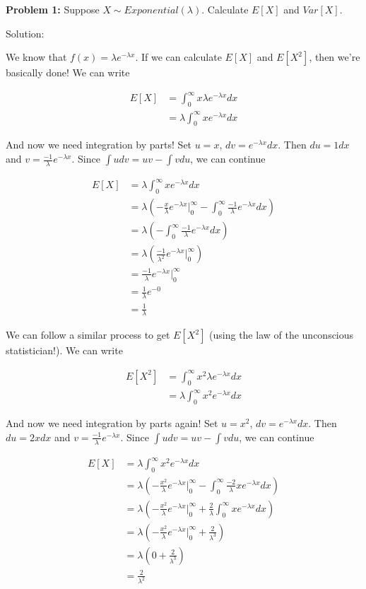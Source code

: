\documentclass[
  letterpaper,
  DIV=11,
  numbers=noendperiod]{scrreprt}
\begin{document}
\textbf{Problem 1:} Suppose \(X \sim Exponential(\lambda)\). Calculate
\(E[X]\) and \(Var[X]\).

Solution:

We know that \(f(x) = \lambda e^{-\lambda x}\). If we can calculate
\(E[X]\) and \(E[X^2]\), then we're basically done! We can write

\begin{align*}    
E[X] & = \int_0^\infty x \lambda e^{-\lambda x} dx \\    
& = \lambda \int_0^\infty x e^{-\lambda x} dx 
\end{align*}

And now we need integration by parts! Set \(u = x\),
\(dv = e^{-\lambda x} dx\). Then \(du = 1dx\) and
\(v = \frac{-1}{\lambda} e^{-\lambda x}\). Since
\(\int u dv = uv - \int vdu\), we can continue

\begin{align*}    
E[X] & = \lambda \int_0^\infty x e^{-\lambda x} dx \\    
& = \lambda \left( -\frac{x}{\lambda} e^{-\lambda x} \bigg|_0^\infty  - \int_0^\infty \frac{-1}{\lambda} e^{-\lambda x} dx \right) \\    
& = \lambda \left( - \int_0^\infty \frac{-1}{\lambda} e^{-\lambda x} dx \right) \\    
& = \lambda \left( \frac{-1}{\lambda^2} e^{-\lambda x}  \bigg|_0^\infty \right) \\    
& = \frac{-1}{\lambda} e^{-\lambda x}  \bigg|_0^\infty \\    
& = \frac{1}{\lambda} e^{-0} \\    
& = \frac{1}{\lambda}
\end{align*}

We can follow a similar process to get \(E[X^2]\) (using the law of the
unconscious statistician!). We can write

\begin{align*}
    E[X^2] & = \int_0^\infty x^2 \lambda e^{-\lambda x} dx \\
    & = \lambda \int_0^\infty x^2 e^{-\lambda x} dx 
\end{align*}

And now we need integration by parts again! Set \(u = x^2\),
\(dv = e^{-\lambda x} dx\). Then \(du = 2xdx\) and
\(v = \frac{-1}{\lambda} e^{-\lambda x}\). Since
\(\int u dv = uv - \int vdu\), we can continue

\begin{align*}
    E[X] & = \lambda \int_0^\infty x^2 e^{-\lambda x} dx \\
    & = \lambda \left( -\frac{x^2}{\lambda} e^{-\lambda x} \bigg|_0^\infty  - \int_0^\infty \frac{-2}{\lambda} xe^{-\lambda x} dx \right) \\
    & = \lambda \left( -\frac{x^2}{\lambda} e^{-\lambda x} \bigg|_0^\infty  + \frac{2}{\lambda} \int_0^\infty  xe^{-\lambda x} dx \right) \\
    & = \lambda \left( -\frac{x^2}{\lambda} e^{-\lambda x} \bigg|_0^\infty  + \frac{2}{\lambda^3} \right)\\
    & = \lambda \left( 0  + \frac{2}{\lambda^3} \right) \\
    & = \frac{2}{\lambda^2}
\end{align*}
\end{document}

